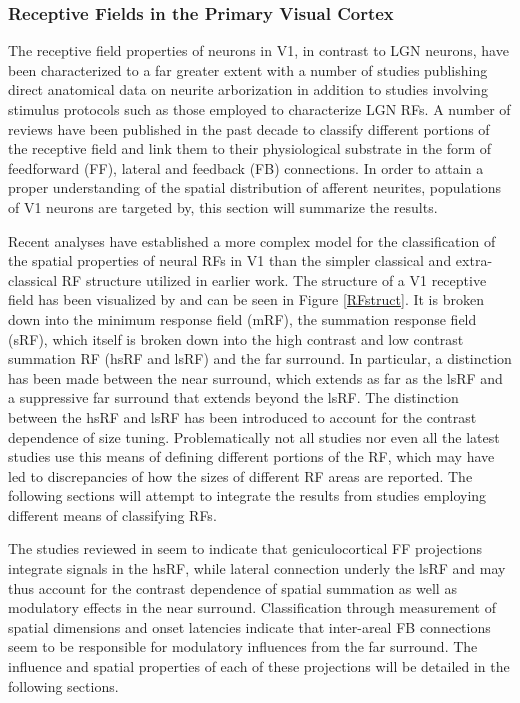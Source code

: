 \subsubsection{Receptive Fields in the Primary Visual Cortex}

The receptive field properties of neurons in V1, in contrast to LGN
neurons, have been characterized to a far greater extent with a number
of studies publishing direct anatomical data on neurite arborization
in addition to studies involving stimulus protocols such as those
employed to characterize LGN RFs. A number of reviews have been
published in the past decade to classify different portions of the
receptive field and link them to their physiological substrate in the
form of feedforward (FF), lateral and feedback (FB) connections. In
order to attain a proper understanding of the spatial distribution of
afferent neurites, populations of V1 neurons are targeted by, this
section will summarize the results.

Recent analyses have established a more complex model for the
classification of the spatial properties of neural RFs in V1 than the
simpler classical and extra-classical RF structure utilized in earlier
work. The structure of a V1 receptive field has been visualized by
\cite{Angelucci2006a} and can be seen in Figure \ref{RFstruct}. It is
broken down into the minimum response field (mRF), the summation
response field (sRF), which itself is broken down into the high
contrast and low contrast summation RF (hsRF and lsRF) and the far
surround. In particular, a distinction has been made between the near
surround, which extends as far as the lsRF and a suppressive far
surround that extends beyond the lsRF. The distinction between the
hsRF and lsRF has been introduced to account for the contrast
dependence of size tuning. Problematically not all studies nor even
all the latest studies use this means of defining different portions
of the RF, which may have led to discrepancies of how the sizes of
different RF areas are reported. The following sections will attempt
to integrate the results from studies employing different means of
classifying RFs.

The studies reviewed in \cite{Angelucci2006a} seem to indicate that
geniculocortical FF projections integrate signals in the hsRF, while
lateral connection underly the lsRF and may thus account for the
contrast dependence of spatial summation as well as modulatory effects
in the near surround. Classification through measurement of spatial
dimensions and onset latencies indicate that inter-areal FB
connections seem to be responsible for modulatory influences from the
far surround. The influence and spatial properties of each of these
projections will be detailed in the following sections.

